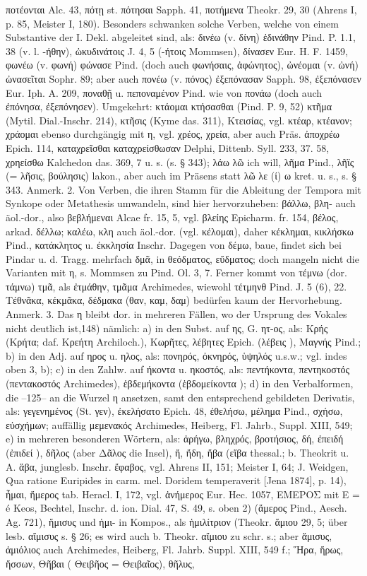 ποτέονται Alc. 43, πότῃ st. πότησαι Sapph. 41, ποτήμενα Theokr. 29, 30 (Ahrens I, p. 85, Meister I, 180). Besonders schwanken solche Verben, welche von einem Substantive der I. Dekl. abgeleitet sind, als: δινέω (v. δίνη) ἐδινάθην Pind. P. 1.1, 38 (v. l. -ήθην), ὠκυδινάτοις J. 4, 5 (-ήτοις Mommsen), δίνασεν Eur. H. F. 1459, φωνέω (v. φωνή) φώνασε Pind. (doch auch φωνήσαις, ἀφώνητος), ὠνέομαι (v. ὠνή) ὠνασεῖται Sophr. 89; aber auch πονέω (v. πόνος) ἐξεπόνασαν Sapph. 98, ἐξεπόνασεν Eur. Iph. A. 209, ποναθῇ u. πεποναμένον Pind. wie von πονάω (doch auch ἐπόνησα, ἐξεπόνησεν). Umgekehrt: κτάομαι κτήσασθαι (Pind. P. 9, 52) κτῆμα (Mytil. Dial.-Inschr. 214), κτῆσις (Kyme das. 311),  Κτεισίας, vgl. κτέαρ, κτέανον; χράομαι ebenso durchgängig mit η, vgl. χρέος, χρεία, aber auch Präs. ἀποχρέω Epich. 114, καταχρεῖσθαι καταχρείσθωσαν Delphi, Dittenb. Syll. 233, 37. 58, χρηείσθω Kalchedon das. 369, 7 u. s. (s. § 343); λάω λῶ ich will, λῆμα Pind., λῆϊς (= λῆσις, βούλησις) lakon., aber auch im Präsens statt λῶ λε (ί) ω kret. u. s., s. § 343. Anmerk. 2. Von Verben, die ihren Stamm für die Ableitung der Tempora mit Synkope oder Metathesis umwandeln, sind hier hervorzuheben: βάλλω, βλη- auch äol.-dor., also βεβλήμεναι Alcae fr. 15, 5, vgl. βλείης Epicharm. fr. 154, βέλος, arkad. δέλλω; καλέω, κλη auch äol.-dor. (vgl. κέλομαι), daher κέκλημαι, κικλήσκω Pind., κατάκλητος u. ἐκκλησία Inschr. Dagegen von δέμω, baue, findet sich bei Pindar u. d. Tragg. mehrfach δμᾶ, in θεόδματος, εὔδματος; doch mangeln nicht die Varianten mit η, s. Mommsen zu Pind. Ol. 3, 7. Ferner kommt von τέμνω (dor. τάμνω) τμᾶ, als ἐτμάθην, τμᾶμα Archimedes, wiewohl τέτμηνθ Pind. J. 5 (6), 22. Τέθνᾶκα, κέκμᾶκα, δέδμακα (θαν, καμ, δαμ) bedürfen kaum der Hervorhebung. Anmerk. 3. Das η bleibt dor. in mehreren Fällen, wo der Ursprung des Vokales nicht deutlich ist,148) nämlich: a) in den Subst. auf ης, G. ητ-ος, als: Κρής (Κρήτα; daf. Κρεήτη Archiloch.), Κωρῆτες, λέβητες Epich. (λέβεις ), Μαγνής Pind.; b) in den Adj. auf ηρος u. ηλος, als: πονηρός, ὀκνηρός, ὑψηλός u.s.w.; vgl. indes oben 3, b); c) in den Zahlw. auf ήκοντα u. ηκοστός, als: πεντήκοντα, πεντηκοστός (πεντακοστός Archimedes), ἑβδεμήκοντα (ἑβδομείκοντα ); d) in den Verbalformen, die --125-- an die Wurzel η ansetzen, samt den entsprechend gebildeten Derivatis, als: γεγενημένος (St. γεν), ἐκελήσατο Epich. 48, ἐθελήσω, μέλημα Pind., σχήσω, εὐσχήμων; auffällig μεμενακός Archimedes, Heiberg, Fl. Jahrb., Suppl. XIII, 549; e) in mehreren besonderen Wörtern, als: ἀρήγω, βληχρός, βροτήσιος, δή, ἐπειδή (ἐπιδεί ), δῆλος (aber Δᾶλος die Insel), ἤ, ἤδη, ἥβα (εἵβα  thessal.; b. Theokrit u. A. ἅβα, junglesb. Inschr. ἔφαβος, vgl. Ahrens II, 151; Meister I, 64; J. Weidgen, Qua ratione Euripides in carm. mel. Doridem temperaverit [Jena 1874], p. 14), ἧμαι, ἥμερος tab. Heracl. I, 172, vgl. ἀνήμερος Eur. Hec. 1057, ΕΜΕΡΟΣ mit E = é Keos, Bechtel, Inschr. d. ion. Dial. 47, S. 49, s. oben 2) (ἅμερος Pind., Aesch. Ag. 721), ἥμισυς und ἡμι- in Kompos., als ἡμιλίτριον (Theokr. ἅμιου 29, 5; über lesb. αἴμισυς s. § 26; es wird auch b. Theokr. αἴμιου zu schr. s.; aber ἅμισυς, ἁμιόλιος auch Archimedes, Heiberg, Fl. Jahrb. Suppl. XIII, 549 f.; Ἥρα, ἥρως, ἥσσων, Θῆβαι ( Θειβῆος = Θειβαῖος), θῆλυς, 